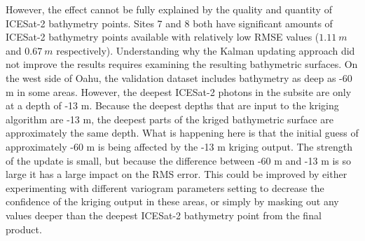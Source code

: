 However, the effect cannot be fully explained by the quality and quantity of ICESat-2 bathymetry points. Sites 7 and 8 both have significant amounts of ICESat-2 bathymetry points available with relatively low RMSE values ($1.11~m$ and $0.67~m$ respectively). Understanding why the Kalman updating approach did not improve the results requires examining the resulting bathymetric surfaces. On the west side of Oahu, the validation dataset includes bathymetry as deep as -60 m in some areas. However, the deepest ICESat-2 photons in the subsite are only at a depth of -13 m. Because the deepest depths that are input to the kriging algorithm are -13 m, the deepest parts of the kriged bathymetric surface are approximately the same depth. What is happening here is that the initial guess of approximately -60 m is being affected by the -13 m kriging output. The strength of the update is small, but because the difference between -60 m and -13 m is so large it has a large impact on the RMS error. This could be improved by either experimenting with different variogram parameters setting to decrease the confidence of the kriging output in these areas, or simply by masking out any values deeper than the deepest ICESat-2 bathymetry point from the final product.

\begin{figure}
    \begin{floatrow}
    \end{floatrow}
\end{figure}

